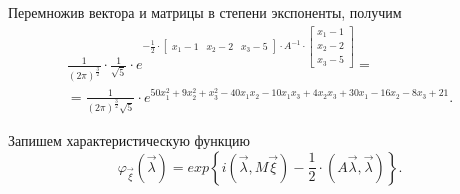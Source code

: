\begin{enumerate}[label=\alph*)]
  Перемножив вектора и матрицы в степени экспоненты, получим
  \begin{equation*}
    \begin{split}
      \frac{1}{ \left( 2 \pi \right)^{ \frac{3}{2}}} \cdot \frac{1}{ \sqrt{5}} \cdot
      e^{- \frac{1}{2} \cdot
        \begin{bmatrix}
          x_1 - 1 & x_2 - 2 & x_3 - 5
        \end{bmatrix} \cdot A^{-1} \cdot
        \begin{bmatrix}
          x_1 - 1 \\
          x_2 - 2 \\
          x_3 - 5
        \end{bmatrix}} = \\
      = \frac{1}{ \left( 2 \pi \right)^{ \frac{3}{2}} \sqrt{5}} \cdot
      e^{50x_1^2 + 9x_2^2 + x_3^2 - 40x_1 x_2 - 10x_1 x_3 + 4x_2 x_3 + 30x_1 - 16x_2 - 8x_3 + 21}.
    \end{split}
  \end{equation*}

  Запишем характеристическую функцию
  $$ \varphi_{ \vec{ \xi }} \left( \vec{ \lambda } \right) =
    exp \left\{
      i \left( \vec{ \lambda }, M \vec{ \xi } \right) -
      \frac{1}{2} \cdot \left( A \vec{ \lambda }, \vec{ \lambda }
    \right) \right\}.$$
\end{enumerate}
